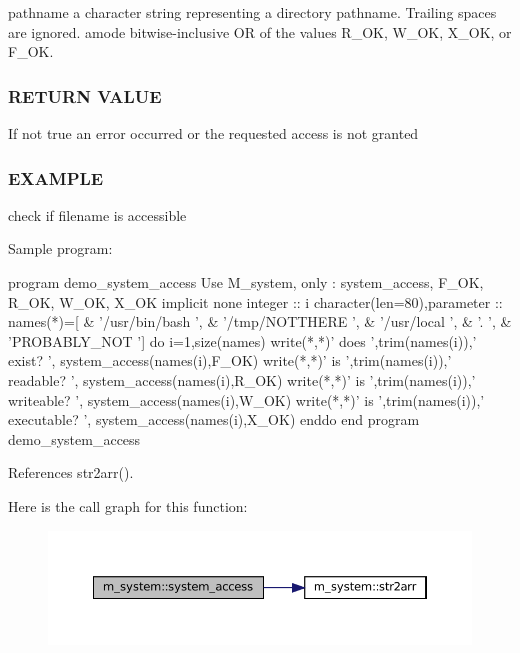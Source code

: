 pathname a character string representing a directory pathname. Trailing spaces are ignored. amode bitwise-\/inclusive OR of the values R\+\_\+\+OK, W\+\_\+\+OK, X\+\_\+\+OK, or F\+\_\+\+OK.

\subsubsection*{R\+E\+T\+U\+RN V\+A\+L\+UE}

If not true an error occurred or the requested access is not granted

\subsubsection*{E\+X\+A\+M\+P\+LE}

check if filename is accessible \begin{DoxyVerb} Sample program:

    program demo_system_access
    Use M_system, only : system_access, F_OK, R_OK, W_OK, X_OK
    implicit none
    integer                     :: i
    character(len=80),parameter :: names(*)=[ &
    '/usr/bin/bash   ', &
    '/tmp/NOTTHERE   ', &
    '/usr/local      ', &
    '.               ', &
    'PROBABLY_NOT    ']
    do i=1,size(names)
       write(*,*)' does ',trim(names(i)),' exist?    ', system_access(names(i),F_OK)
       write(*,*)' is ',trim(names(i)),' readable?     ', system_access(names(i),R_OK)
       write(*,*)' is ',trim(names(i)),' writeable?    ', system_access(names(i),W_OK)
       write(*,*)' is ',trim(names(i)),' executable?   ', system_access(names(i),X_OK)
    enddo
    end program demo_system_access \end{DoxyVerb}
 

References str2arr().

Here is the call graph for this function\+:
\nopagebreak
\begin{figure}[H]
\begin{center}
\leavevmode
\includegraphics[width=350pt]{namespacem__system_a4687a363acbb7084a51bc77844789275_cgraph}
\end{center}
\end{figure}
\mbox{\label{namespacem__system_a47746b670cb21bae0957c9bb2bccf209}} 
